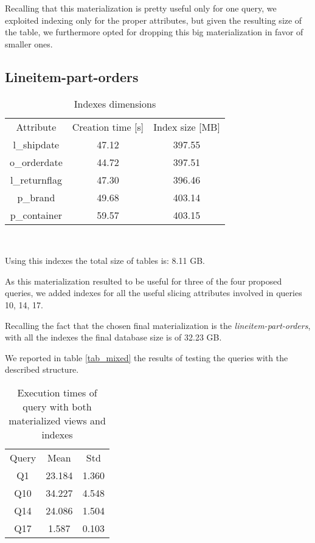 Recalling that this materialization is pretty useful only for one query, we exploited indexing only for the proper attributes, but given the resulting size of the table, we furthermore opted for dropping this big materialization in favor of smaller ones.

\subsection{Lineitem-part-orders}

\begin{table}[H]
\centering
\begin{tabular}{c|c|c}
\rowcolor{blue!50}  Attribute       & Creation time [s] & Index size [MB]\\
\rowcolor{gray!10} l\_shipdate      & 47.12          & 397.55 \\ 
\rowcolor{white} o\_orderdate       & 44.72          & 397.51 \\ 
\rowcolor{gray!10} l\_returnflag    & 47.30          & 396.46 \\
\rowcolor{white}   p\_brand         & 49.68          & 403.14 \\
\rowcolor{gray!10} p\_container     & 59.57          & 403.15 \\ 
\end{tabular}\\[0.5cm]
    \caption{Indexes dimensions}
\end{table}

Using this indexes the total size of tables is: 8.11 GB.

As this materialization resulted to be useful for three of the four proposed queries, we added indexes for all the useful slicing attributes involved in queries 10, 14, 17.

Recalling the fact that the chosen final materialization is the \textit{lineitem-part-orders}, with all the indexes the final database size is of 32.23 GB.

We reported in table \ref{tab_mixed} the results of testing the queries with the described structure.



\begin{table}[H] 
\centering \begin{tabular}{c|c|c} 
\rowcolor{blue!50} Query & Mean & Std\\
\rowcolor{gray!10} Q1 &23.184 &1.360\\
\rowcolor{white} Q10 &34.227 &4.548\\
\rowcolor{gray!10} Q14 &24.086 &1.504\\
\rowcolor{white} Q17 &1.587 &0.103\\
\end{tabular}\\[0.5cm] 
\caption{Execution times of query with both materialized views and indexes} 
\label{tab:mixed} 
\end{table}